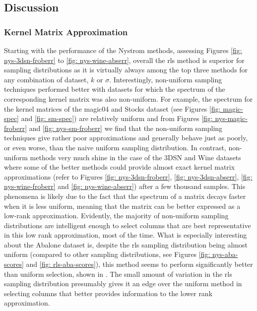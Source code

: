 \subsection{Discussion}\label{Section5.3}

\subsubsection{Kernel Matrix Approximation}\label{Section5.3.1}

Starting with the performance of the Nystrom methods, assessing Figures \ref{fig: nys-3dsn-froberr} to \ref{fig: nys-wine-abserr}, overall the rls method is superior for sampling distributions as it is virtually always among the top three methods for any combination of dataset, $k$ or $\sigma$. Interestingly, non-uniform sampling techniques performed better with datasets for which the spectrum of the corresponding kernel matrix was also non-uniform. For example, the spectrum for the kernel matrices of the magic04 and Stocks dataset (see Figures \ref{fig: magic-spec} and \ref{fig: sm-spec}) are relatively uniform and from Figures \ref{fig: nys-magic-froberr} and \ref{fig: nys-sm-froberr} we find that the non-uniform sampling techniques give rather poor approximations and generally behave just as poorly, or even worse, than the naive uniform sampling distribution. In contrast, non-uniform methods very much shine in the case of the 3DSN and Wine datasets where some of the better methods could provide almost exact kernel matrix approximations (refer to Figures \ref{fig: nys-3dsn-froberr}, \ref{fig: nys-3dsn-abserr}, \ref{fig: nys-wine-froberr} and \ref{fig: nys-wine-abserr}) after a few thousand samples. This phenomena is likely due to the fact that the spectrum of a matrix decays faster when it is less uniform, meaning that the matrix can be better expressed as a low-rank approximation. Evidently, the majority of non-uniform sampling distributions are intelligent enough to select columns that are best representative in this low rank approximation, most of the time. What is especially interesting about the Abalone dataset is, despite the rls sampling distribution being almost uniform (compared to other sampling distributions, see Figures \ref{fig: nys-aba-scores} and \ref{fig: rls-aba-scores}), this method seems to perform significantly better than uniform selection, shown in . The small amount of variation in the rls sampling distribution presumably gives it an edge over the uniform method in selecting columns that better provides information to the lower rank approximation.

